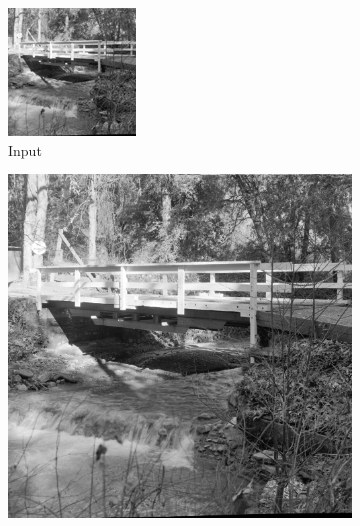\documentclass[12pt,a4paper]{article}
\begin{document}
        \begin{figure}[H]
            \centering
            \begin{subfigure}{0.2\textwidth}
                \includegraphics[width=\textwidth]{images/samples/img-3-input.png}
                \caption*{Input}
            \end{subfigure}
            \enspace
            \begin{subfigure}{0.2\textwidth}
                \includegraphics[width=\textwidth]{images/samples/img-3-orig.png}

\end{subfigure}
\end{figure}
\end{document}
